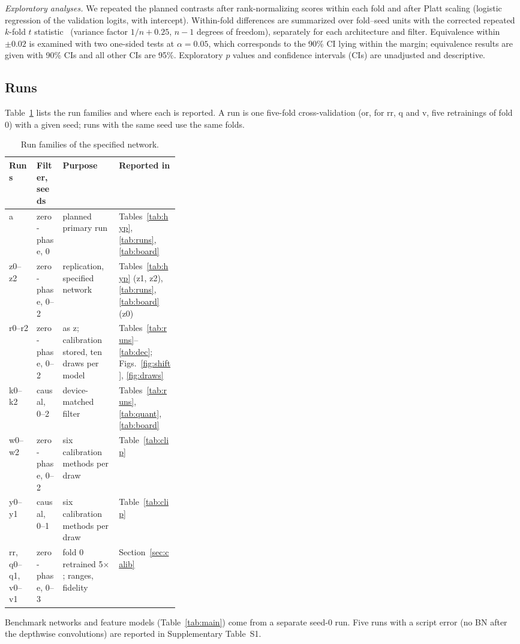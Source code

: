 \documentclass[preprint,12pt]{elsarticle}
\begin{document}
\emph{Exploratory analyses.} We repeated the planned contrasts after rank-normalizing scores within each fold and after Platt scaling (logistic regression of the validation logits, with intercept). Within-fold differences are summarized over fold--seed units with the corrected repeated $k$-fold $t$ statistic~\cite{Nadeau2003,Bouckaert2004} (variance factor $1/n + 0.25$, $n-1$ degrees of freedom), separately for each architecture and filter. Equivalence within $\pm0.02$ is examined with two one-sided tests at $\alpha=0.05$, which corresponds to the 90\% CI lying within the margin; equivalence results are given with 90\% CIs and all other CIs are 95\%. Exploratory $p$ values and confidence intervals (CIs) are unadjusted and descriptive.

\subsection{Runs}
\label{sec:runs}
Table~\ref{tab:fam} lists the run families and where each is reported. A run is one five-fold cross-validation (or, for rr, q and v, five retrainings of fold 0) with a given seed; runs with the same seed use the same folds.

\begin{table}[!t]
\caption{Run families of the specified network.}
\label{tab:fam}
\centering\scriptsize
\setlength{\tabcolsep}{2.5pt}
\begin{tabular*}{\linewidth}{@{\extracolsep{\fill}}llp{0.33\linewidth}l@{}}
\toprule
Runs & Filter, seeds & Purpose & Reported in \\
\midrule
a & zero-phase, 0 & planned primary run & Tables~\ref{tab:hyp}, \ref{tab:runs}, \ref{tab:board} \\
z0--z2 & zero-phase, 0--2 & replication, specified network & Tables~\ref{tab:hyp} (z1, z2), \ref{tab:runs}, \ref{tab:board} (z0) \\
r0--r2 & zero-phase, 0--2 & as z; calibration stored, ten draws per model & Tables~\ref{tab:runs}--\ref{tab:dec}; Figs.~\ref{fig:shift}, \ref{fig:draws} \\
k0--k2 & causal, 0--2 & device-matched filter & Tables~\ref{tab:runs}, \ref{tab:quant}, \ref{tab:board} \\
w0--w2 & zero-phase, 0--2 & six calibration methods per draw & Table~\ref{tab:clip} \\
y0--y1 & causal, 0--1 & six calibration methods per draw & Table~\ref{tab:clip} \\
rr, q0--q1, v0--v1 & zero-phase, 0--3 & fold 0 retrained 5$\times$; ranges, fidelity & Section~\ref{sec:calib} \\
\bottomrule
\end{tabular*}

\vspace{2pt}\parbox{\linewidth}{\footnotesize Benchmark networks and feature models (Table~\ref{tab:main}) come from a separate seed-0 run. Five runs with a script error (no BN after the depthwise convolutions) are reported in Supplementary Table~S1.}
\end{table}
\end{document}

